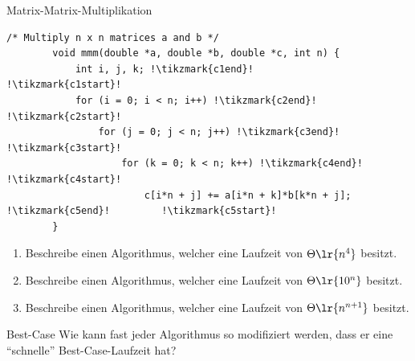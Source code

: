 \begin{frame}[fragile]{Matrix-Matrix-Multiplikation}
    \begin{lstlisting}[escapechar=!, basicstyle=\footnotesize]
        /* Multiply n x n matrices a and b */
        void mmm(double *a, double *b, double *c, int n) {
            int i, j, k; !\tikzmark{c1end}!                                             !\tikzmark{c1start}!
            for (i = 0; i < n; i++) !\tikzmark{c2end}!                                  !\tikzmark{c2start}!
                for (j = 0; j < n; j++) !\tikzmark{c3end}!                              !\tikzmark{c3start}!
                    for (k = 0; k < n; k++) !\tikzmark{c4end}!                          !\tikzmark{c4start}!
                        c[i*n + j] += a[i*n + k]*b[k*n + j]; !\tikzmark{c5end}!         !\tikzmark{c5start}!
        }
    \end{lstlisting}
\end{frame}

\begin{frame}[fragile]
    \begin{enumerate}
        \item Beschreibe einen Algorithmus, welcher eine Laufzeit von $\Theta\lr{n^4}$ besitzt.
        \item Beschreibe einen Algorithmus, welcher eine Laufzeit von $\Theta\lr{10^n}$ besitzt.
        \item Beschreibe einen Algorithmus, welcher eine Laufzeit von $\Theta\lr{n^{n+1}}$ besitzt.
    \end{enumerate}
\end{frame}

\begin{frame}[fragile]{Best-Case}
    Wie kann fast jeder Algorithmus so modifiziert werden, dass er eine \enquote{schnelle} Best-Case-Laufzeit hat? 
\end{frame}

